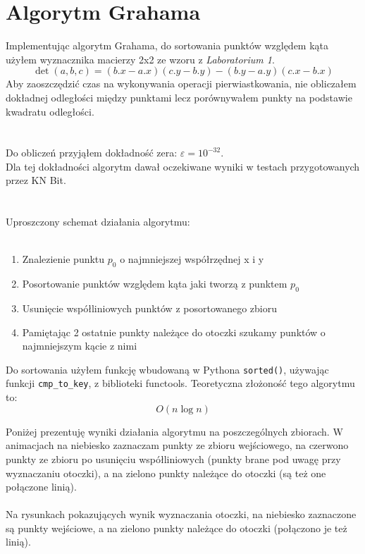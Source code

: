 \documentclass[a4paper]{article}
\begin{document}
\pagebreak
\section{Algorytm Grahama}
Implementując algorytm Grahama, do sortowania punktów względem kąta użyłem wyznacznika macierzy 2x2
ze wzoru z \textit{Laboratorium 1}.
\[
    \det{(a, b, c)} = (b.x - a.x)(c.y - b.y) - (b.y - a.y)(c.x - b.x)   
\]
Aby zaoszczędzić czas na wykonywania operacji pierwiastkowania, nie obliczałem dokładnej odległości między
punktami lecz porównywałem punkty na podstawie kwadratu odległości.
\\\\\\
Do obliczeń przyjąłem dokładność zera: $\varepsilon = 10^{-32}$.\\ 
Dla tej dokładności algorytm dawał oczekiwane wyniki w
 testach przygotowanych przez KN Bit.
\\\\\\
Uproszczony schemat działania algorytmu:\\\\

\begin{enumerate}
    \item Znalezienie punktu $p_0$ o najmniejszej współrzędnej x i y
    \item Posortowanie punktów względem kąta jaki tworzą z punktem $p_0$
    \item Usunięcie współliniowych punktów z posortowanego zbioru
    \item Pamiętając 2 ostatnie punkty należące do otoczki szukamy punktów o najmniejszym kącie z nimi
\end{enumerate}

Do sortowania użyłem funkcję wbudowaną w Pythona \verb|sorted()|, używając funkcji \verb|cmp_to_key|, z biblioteki functools. Teoretyczna złożoność tego algorytmu to:
\[O(n\log n)\]

Poniżej prezentuję wyniki działania algorytmu na poszczególnych zbiorach. W animacjach na niebiesko zaznaczam
punkty ze zbioru wejściowego, na czerwono punkty ze zbioru po usunięciu współliniowych (punkty brane pod uwagę przy wyznaczaniu otoczki),
a na zielono punkty należące do otoczki (są też one połączone linią).\\\\ 
Na rysunkach pokazujących wynik wyznaczania otoczki, na niebiesko zaznaczone są punkty wejściowe, a na zielono
punkty należące do otoczki (połączono je też linią).
\end{document}
